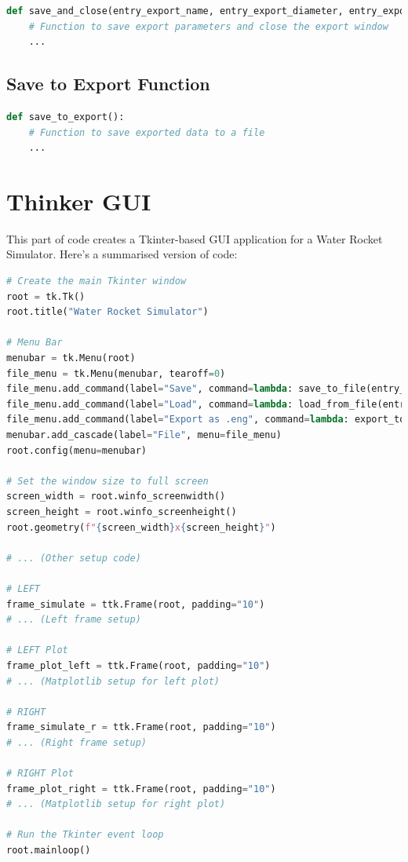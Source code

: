 \documentclass{report}
\begin{document}
\begin{lstlisting}[language=Python]
def save_and_close(entry_export_name, entry_export_diameter, entry_export_lenght, entry_export_man, window):
    # Function to save export parameters and close the export window
    ...
\end{lstlisting}

\section{Save to Export Function}

\begin{lstlisting}[language=Python]
def save_to_export():
    # Function to save exported data to a file
    ...
\end{lstlisting}

\chapter{Thinker GUI}
This part of code creates a Tkinter-based GUI application for a Water Rocket Simulator. Here's a summarised version of code:

\begin{lstlisting}[language=Python]
# Create the main Tkinter window
root = tk.Tk()
root.title("Water Rocket Simulator")

# Menu Bar
menubar = tk.Menu(root)
file_menu = tk.Menu(menubar, tearoff=0)
file_menu.add_command(label="Save", command=lambda: save_to_file(entry_0))
file_menu.add_command(label="Load", command=lambda: load_from_file(entry_0))
file_menu.add_command(label="Export as .eng", command=lambda: export_to_file())
menubar.add_cascade(label="File", menu=file_menu)
root.config(menu=menubar)

# Set the window size to full screen
screen_width = root.winfo_screenwidth()
screen_height = root.winfo_screenheight()
root.geometry(f"{screen_width}x{screen_height}")

# ... (Other setup code)

# LEFT
frame_simulate = ttk.Frame(root, padding="10")
# ... (Left frame setup)

# LEFT Plot
frame_plot_left = ttk.Frame(root, padding="10")
# ... (Matplotlib setup for left plot)

# RIGHT
frame_simulate_r = ttk.Frame(root, padding="10")
# ... (Right frame setup)

# RIGHT Plot
frame_plot_right = ttk.Frame(root, padding="10")
# ... (Matplotlib setup for right plot)

# Run the Tkinter event loop
root.mainloop()
\end{lstlisting}
\end{document}
